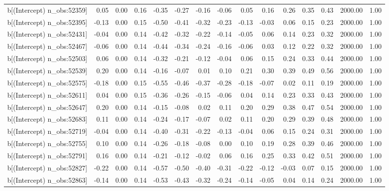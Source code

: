 \begin{table}[ht]
\begin{tabular}{rrrrrrrrrrrrrrr}
  b[(Intercept) n\_obs:52359] & 0.05 & 0.00 & 0.16 & -0.35 & -0.27 & -0.16 & -0.06 & 0.05 & 0.16 & 0.26 & 0.35 & 0.43 & 2000.00 & 1.00 \\ 
  b[(Intercept) n\_obs:52395] & -0.13 & 0.00 & 0.15 & -0.50 & -0.41 & -0.32 & -0.23 & -0.13 & -0.03 & 0.06 & 0.15 & 0.23 & 2000.00 & 1.00 \\ 
  b[(Intercept) n\_obs:52431] & -0.04 & 0.00 & 0.14 & -0.42 & -0.32 & -0.22 & -0.14 & -0.05 & 0.06 & 0.14 & 0.23 & 0.32 & 2000.00 & 1.00 \\ 
  b[(Intercept) n\_obs:52467] & -0.06 & 0.00 & 0.14 & -0.44 & -0.34 & -0.24 & -0.16 & -0.06 & 0.03 & 0.12 & 0.22 & 0.32 & 2000.00 & 1.00 \\ 
  b[(Intercept) n\_obs:52503] & 0.06 & 0.00 & 0.14 & -0.32 & -0.21 & -0.12 & -0.04 & 0.06 & 0.15 & 0.24 & 0.33 & 0.44 & 2000.00 & 1.00 \\ 
  b[(Intercept) n\_obs:52539] & 0.20 & 0.00 & 0.14 & -0.16 & -0.07 & 0.01 & 0.10 & 0.21 & 0.30 & 0.39 & 0.49 & 0.56 & 2000.00 & 1.00 \\ 
  b[(Intercept) n\_obs:52575] & -0.18 & 0.00 & 0.15 & -0.55 & -0.46 & -0.37 & -0.28 & -0.18 & -0.07 & 0.02 & 0.11 & 0.19 & 2000.00 & 1.00 \\ 
  b[(Intercept) n\_obs:52611] & 0.04 & 0.00 & 0.15 & -0.36 & -0.26 & -0.15 & -0.06 & 0.04 & 0.14 & 0.23 & 0.33 & 0.43 & 2000.00 & 1.00 \\ 
  b[(Intercept) n\_obs:52647] & 0.20 & 0.00 & 0.14 & -0.15 & -0.08 & 0.02 & 0.11 & 0.20 & 0.29 & 0.38 & 0.47 & 0.54 & 2000.00 & 1.00 \\ 
  b[(Intercept) n\_obs:52683] & 0.11 & 0.00 & 0.14 & -0.24 & -0.17 & -0.07 & 0.02 & 0.11 & 0.20 & 0.29 & 0.39 & 0.48 & 2000.00 & 1.00 \\ 
  b[(Intercept) n\_obs:52719] & -0.04 & 0.00 & 0.14 & -0.40 & -0.31 & -0.22 & -0.13 & -0.04 & 0.06 & 0.15 & 0.24 & 0.31 & 2000.00 & 1.00 \\ 
  b[(Intercept) n\_obs:52755] & 0.10 & 0.00 & 0.14 & -0.26 & -0.18 & -0.08 & 0.00 & 0.10 & 0.19 & 0.28 & 0.39 & 0.46 & 2000.00 & 1.00 \\ 
  b[(Intercept) n\_obs:52791] & 0.16 & 0.00 & 0.14 & -0.21 & -0.12 & -0.02 & 0.06 & 0.16 & 0.25 & 0.33 & 0.42 & 0.51 & 2000.00 & 1.00 \\ 
  b[(Intercept) n\_obs:52827] & -0.22 & 0.00 & 0.14 & -0.57 & -0.50 & -0.40 & -0.31 & -0.22 & -0.12 & -0.03 & 0.07 & 0.15 & 2000.00 & 1.00 \\ 
  b[(Intercept) n\_obs:52863] & -0.14 & 0.00 & 0.14 & -0.53 & -0.43 & -0.32 & -0.24 & -0.14 & -0.05 & 0.04 & 0.14 & 0.24 & 2000.00 & 1.00 \\ 

\end{tabular}
\end{table}
